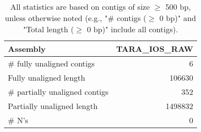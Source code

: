 \documentclass[12pt,a4paper]{article}
\begin{document}
\begin{table}[ht]
\begin{center}
\caption{All statistics are based on contigs of size $\geq$ 500 bp, unless otherwise noted (e.g., "\# contigs ($\geq$ 0 bp)" and "Total length ($\geq$ 0 bp)" include all contigs).}
\begin{tabular}{|l*{1}{|r}|}
\hline
Assembly & TARA\_IOS\_RAW \\ \hline
\# fully unaligned contigs & 6 \\ \hline
Fully unaligned length & 106630 \\ \hline
\# partially unaligned contigs & 352 \\ \hline
Partially unaligned length & 1498832 \\ \hline
\# N's & 0 \\ \hline
\end{tabular}
\end{center}
\end{table}
\end{document}

